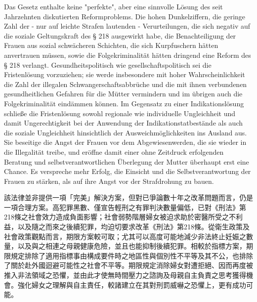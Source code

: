 \documentclass[12pt]{article}
\begin{document}
\syncleft
\begin{sourcepara}
Das Gesetz enthalte keine "perfekte", aber eine sinnvolle Lösung des seit Jahrzehnten diskutierten Reformproblems. Die hohen Dunkelziffern, die geringe Zahl der - nur auf leichte Strafen lautenden - Verurteilungen, die sich negativ auf die soziale Geltungskraft des § 218 \abbrStGB{} ausgewirkt habe, die Benachteiligung der Frauen aus sozial schwächeren Schichten, die sich Kurpfuschern hätten anvertrauen müssen, sowie die Folgekriminalität hätten dringend eine Reform des § 218 \abbrStGB{} verlangt. Gesundheitspolitisch wie gesellschaftspolitisch sei die Fristenlösung vorzuziehen; sie werde insbesondere mit hoher Wahrscheinlichkeit die Zahl der illegalen Schwangerschaftsabbrüche und die mit ihnen verbundenen gesundheitlichen Gefahren für die Mütter vermindern und im übrigen auch die Folgekriminalität eindämmen können. Im Gegensatz zu einer Indikationslösung schließe die Fristenlösung sowohl regionale wie individuelle Ungleichheit und damit Ungerechtigkeit bei der Anwendung der Indikationstatbestände als auch die soziale Ungleichheit hinsichtlich der Ausweichmöglichkeiten ins Ausland aus. Sie beseitige die Angst der Frauen vor dem Abgewiesenwerden, die sie wieder in die Illegalität treibe, und eröffne damit einer ohne Zeitdruck erfolgenden Beratung und selbstverantwortlichen Überlegung der Mutter überhaupt erst eine Chance. Es verspreche mehr Erfolg, die Einsicht und die Selbstverantwortung der Frauen zu stärken, als auf ihre Angst vor der Strafdrohung zu bauen.
\end{sourcepara}
\begin{transpara}
該法律並非提供一項「完美」解決方案，但對已爭論數十年之改革問題而言，仍是一項合理方案。高犯罪黑數、僅宣告輕刑之有罪判決數量偏低，已對《刑法》第218條之社會效力造成負面影響；社會弱勢階層婦女被迫求助於密醫所受之不利益，以及隨之而來之後續犯罪，均迫切要求改革《刑法》第218條。從衛生政策及社會政策觀點而言，期限方案較可取；尤其可以高度可能地減少非法終止妊娠之數量，以及與之相連之母親健康危險，並且也能抑制後續犯罪。相較於指標方案，期限規定排除了適用指標事由構成要件時之地區性與個別性不平等及其不公，也排除了關於赴外國迴避可能性之社會不平等。期限規定消除婦女對遭拒絕、因而再度被推入非法領域之恐懼，並由此才使無時間壓力之諮詢及母親自主負責之思考獲得機會。強化婦女之理解與自主責任，較諸建立在其對刑罰威嚇之恐懼上，更有成功可能。
\end{transpara}
\end{document}
